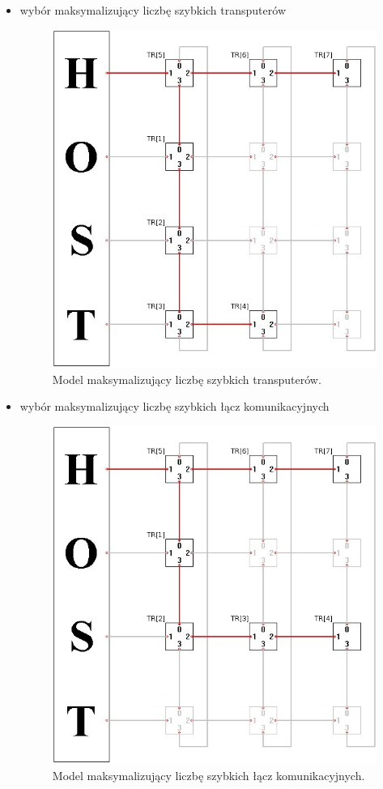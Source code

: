 \documentclass[a4paper,11pt, titlepage]{article}
\begin{document}
\begin{itemize}
\item wybór maksymalizujący liczbę szybkich transputerów
\begin{figure}[htp!]
\includegraphics[scale=0.4]{proce}
\caption{Model maksymalizujący liczbę szybkich transputerów. \label{proce}}
\end{figure} 
\item wybór maksymalizujący liczbę szybkich łącz komunikacyjnych
\begin{figure}[htp!]
\includegraphics[scale=0.4]{lacza}
\caption{Model maksymalizujący liczbę szybkich łącz komunikacyjnych. \label{lacza}}
\end{figure} 
\end{itemize}
\end{document}

